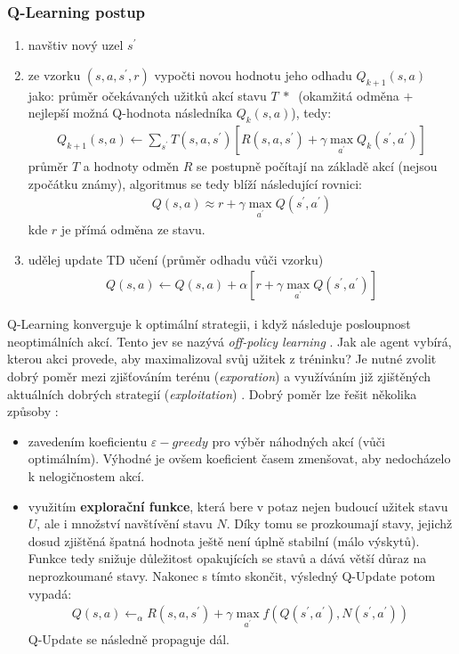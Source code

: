 \subsubsection{Q-Learning postup}
\label{teorie:qlearning}
\begin{enumerate}
  \item navštiv nový uzel $s^\prime$
  \item ze vzorku $(s,a,s^\prime,r)$ vypočti novou hodnotu jeho odhadu $Q_{k+1}(s,a)$ jako:
  \newline
    průměr očekávaných užitků akcí stavu $T\:*\:$ (okamžitá odměna $+$ nejlepší možná Q-hodnota následníka $Q_{k}(s,a)$), tedy:
    \begin{align}
    Q_{k+1}(s,a) \leftarrow \sum_{s^\prime} T(s,a,s^\prime) \left[ R(s,a,s^\prime) + \gamma \max_{a^\prime} Q_k(s^\prime,a^\prime)\right]
    \end{align}
    průměr $T$ a hodnoty odměn $R$ se postupně počítají na základě akcí (nejsou zpočátku známy), algoritmus se tedy blíží následující rovnici:
    \begin{align}
    Q(s,a) \approx r + \gamma \max_{a^\prime}Q(s^\prime,a^\prime)
    \end{align}
    kde $r$ je přímá odměna ze stavu.
  \item udělej update TD učení (průměr odhadu vůči vzorku)
    \begin{align}
    \label{eq:qupdate}
     Q(s,a) \leftarrow  Q(s,a) + \alpha \left [ r + \gamma \max_{a^\prime} Q(s^\prime,a^\prime) \right]
    \end{align}
\end{enumerate}
Q-Learning konverguje k optimální strategii, i když následuje posloupnost neoptimálních akcí. Tento jev se nazývá \textit{off-policy learning} \cite{RLIntro}.
Jak ale agent vybírá, kterou akci provede, aby maximalizoval svůj užitek z tréninku? Je nutné zvolit dobrý poměr mezi zjišťováním terénu (\textit{exporation}) a využíváním již zjištěných aktuálních dobrých strategií (\textit{exploitation}) \cite{RLpaper}. Dobrý poměr lze řešit několika způsoby \cite{berkeley}:
\begin{itemize}
  \item zavedením koeficientu $\varepsilon-greedy$ pro výběr náhodných akcí (vůči optimálním). Výhodné je ovšem koeficient časem zmenšovat, aby nedocházelo k nelogičnostem akcí.
  \item využitím \textbf{explorační funkce}, která bere v potaz nejen budoucí užitek stavu $U$, ale i množství navštívění stavu $N$. Díky tomu se prozkoumají stavy, jejichž dosud zjištěná špatná hodnota ještě není úplně stabilní (málo výskytů). Funkce tedy snižuje důležitost opakujících se stavů a dává větší důraz na neprozkoumané stavy. Nakonec s tímto skončit, výsledný Q-Update potom vypadá:
  \begin{align}
  Q(s,a) \leftarrow_\alpha R(s,a,s^\prime) + \gamma \max_{a^\prime} f(Q(s^\prime,a^\prime),N(s^\prime,a^\prime))\
  \end{align}
  Q-Update se následně propaguje dál.
\end{itemize}
